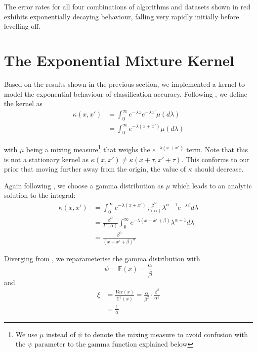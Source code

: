 \documentclass[a4paper,12pt,twoside,openright]{report}
\begin{document}
The error rates for all four combinations of algorithms and datasets shown in red exhibits exponentially decaying behaviour, falling very rapidly initially before levelling off.









\section{The Exponential Mixture Kernel}

Based on the results shown in the previous section, we implemented a kernel to model the exponential behaviour of classification accuracy. Following \cite{2014arXiv1406.3896S}, we define the kernel as
\begin{align}
\kappa(x,x') &= \int_{0}^{\infty} e^{-\lambda x}e^{-\lambda x'}\mu(d\lambda)\\
&= \int_{0}^{\infty} e^{-\lambda(x+x')}\mu(d\lambda)
\end{align}

with $\mu$ being a mixing measure\footnote{We use $\mu$ instead of $\psi$ to denote the mixing measure to avoid confusion with the $\psi$ parameter to the gamma function explained below} that weighs the $e^{-\lambda(x+x')}$ term. Note that this is not a stationary kernel as $\kappa(x, x') \neq \kappa(x + \tau, x' + \tau)$. This conforms to our prior that moving further away from the origin, the value of $\kappa$ should decrease.

Again following \cite{2014arXiv1406.3896S}, we choose a gamma distribution as $\mu$ which leads to an analytic solution to the integral:
\begin{align}
\kappa(x, x') &= \int_0^{\infty} e^{-\lambda(x+x')}\frac{\beta^\alpha}{\Gamma(\alpha)}\lambda^{\alpha -1}e^{-\lambda\beta} d\lambda\\
&=\frac{\beta^\alpha}{\Gamma(\alpha)}\int_0^\infty e^{-\lambda(x+x'+\beta)}\lambda^{\alpha-1}d\lambda\\
&=\frac{\beta^\alpha}{(x+x'+\beta)^\alpha}
\end{align}

Diverging from \cite{2014arXiv1406.3896S}, we reparameterise the gamma distribution with
\begin{equation}
\psi = \mathbb{E}(x) = \frac{\alpha}{\beta}
\end{equation}
and
\begin{align}
\xi &= \frac{Var(x)}{\mathbb{E}^2 (x)} = \frac{\alpha}{\beta^2} \cdot \frac{\beta^2}{\alpha^2}\\
&= \frac{1}{\alpha}
\end{align}
\end{document}
